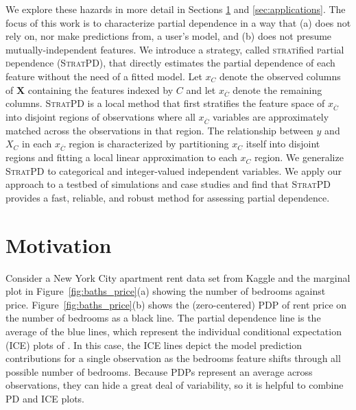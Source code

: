 \documentclass[12pt]{article}
\newcommand{\figref}[1]{Figure~\ref{#1}}
\newcommand{\cut}[1]{}
\newcommand{\spd}{\fontfamily{cmr}\textsc{\small StratPD}}
\newcommand{\xnC}{$x_{\overline{C}}$}
\begin{document}
We explore these hazards in more detail in Sections \ref{sec:motivation} and \ref{sec:applications}. The focus of this work is to characterize partial dependence in a way that (a) does not rely on, nor make predictions from, a user's model, and (b) does not presume mutually-independent features. We introduce a strategy, called {\textsc{strat}ified \textsc{p}artial \textsc{d}ependence} (\spd{}), that directly estimates the partial dependence of each feature without the need of a fitted model. Let ${x}_C$ denote the observed columns of $\mathbf{X}$ containing the features indexed by $C$ and let ${x}_{\overline{C}}$ denote the remaining columns. \spd{} is a local method that first stratifies the feature space of \xnC{} into disjoint regions of observations where all \xnC{} variables are approximately matched across the observations in that region. The relationship between $y$ and $X_C$ in each \xnC{} region is characterized by partitioning ${x}_C$ itself into disjoint regions and fitting a local linear approximation to each ${x}_C$ region. We generalize \spd{} to categorical and integer-valued independent variables. We apply our approach to a testbed of simulations and case studies and find that \spd{} provides a fast, reliable, and robust method for assessing partial dependence. 

\section{Motivation}\label{sec:motivation}
\cut{\cite{PDP} introduced partial dependence (PD) plots as a way to extract and visualize the dependence of the target on one or two features of interest.} Consider a New York City apartment rent data set from Kaggle \cite{rent} and the marginal plot in \figref{fig:baths_price}(a) showing the number of bedrooms against price. \figref{fig:baths_price}(b) shows the (zero-centered) PDP of rent price on the number of bedrooms as a black line. The partial dependence line is the average of the blue lines, which represent the individual conditional expectation (ICE) plots of \cite{ICE}. In this case, the ICE lines depict the model prediction contributions for a single observation as the bedrooms feature shifts through all possible number of bedrooms. Because PDPs represent an average across observations, they can hide a great deal of variability, so it is helpful to combine PD and ICE plots.
\end{document}
